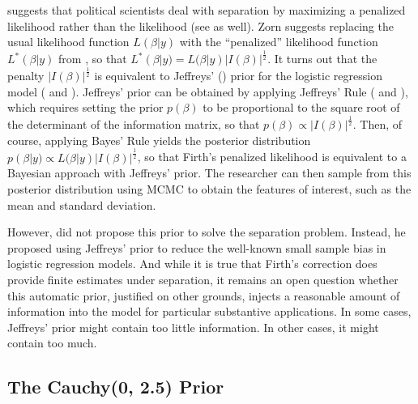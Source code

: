 \documentclass[12pt]{article}
\begin{document}
\cite{Zorn2005} suggests that political scientists deal with separation by maximizing a penalized likelihood rather than the likelihood (see \citealt{HeinzeSchemper2002} as well). 
Zorn suggests replacing the usual likelihood function $L(\beta | y)$ with the ``penalized'' likelihood function $L^*(\beta | y)$ from \cite{Firth1993}, so that $L^*(\beta | y) = L(\beta | y)|I(\beta)|^\frac{1}{2}$. 
It turns out that the penalty $|I(\beta)|^\frac{1}{2}$ is equivalent to Jeffreys' (\citeyear{Jeffreys1946}) prior for the logistic regression model (\citealt{Firth1993} and \citealt{Poirier1994}). 
Jeffreys' prior can be obtained by applying Jeffreys' Rule (\citealt{Jeffreys1946} and \citealt[pp. 41-60]{BoxTaio2011}), which requires setting the prior $p(\beta)$ to be proportional to the square root of the determinant of the information matrix, so that $p(\beta) \propto |I(\beta)|^\frac{1}{2}$. 
Then, of course, applying Bayes' Rule yields the posterior distribution $p(\beta | y) \propto L(\beta | y)|I(\beta)|^\frac{1}{2}$, so that Firth's penalized likelihood is equivalent to a Bayesian approach with Jeffreys' prior. 
The researcher can then sample from this posterior distribution using MCMC to obtain the features of interest, such as the mean and standard deviation.

However, \cite{Firth1993} did not propose this prior to solve the separation problem. 
Instead, he proposed using Jeffreys' prior to reduce the well-known small sample bias in logistic regression models. 
And while it is true that Firth's correction does provide finite estimates under separation, it remains an open question whether this automatic prior, justified on other grounds, injects a reasonable amount of information into the model for particular substantive applications. 
In some cases, Jeffreys' prior might contain too little information. 
In other cases, it might contain too much.

\subsection*{The Cauchy(0, 2.5) Prior}
\end{document}
